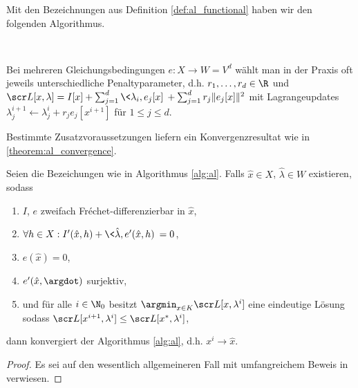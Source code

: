 \documentclass{mythesis}
\begin{document}
\begin{algorithm} \label{alg:al}
    Mit den Bezeichnungen aus Definition \ref{def:al_functional} haben wir den folgenden Algorithmus.

    \begin{samepage}
	\\
	\begin{algorithmic}
	    \EndFor
	\end{algorithmic}
    \end{samepage}
    \begin{note}
	Bei mehreren Gleichungsbedingungen $e: X \to W = V^d$ wählt man in der Praxis oft jeweils unterschiedliche Penaltyparameter, d.h. $r_1, \dotsc, r_d \in \R$ und
	\begin{math}
	    \scr L[x, \lambda] = I[x] + \sum_{j=1}^d \<\lambda_i, e_j[x]\> + \sum_{j=1}^d r_j \|e_j[x]\|^2
	\end{math}
	mit Lagrangeupdates $\lambda^{i+1}_j \gets \lambda^i_j + r_j e_j[x^{i+1}]$ für $1 \le j \le d$.
    \end{note}
\end{algorithm}

Bestimmte Zusatzvoraussetzungen liefern ein Konvergenzresultat wie in \ref{theorem:al_convergence}.

\begin{theorem} \label{theorem:al_convergence}
    Seien die Bezeichungen wie in Algorithmus \ref{alg:al}.
    Falls $\hat x \in X$, $\hat \lambda \in W$ existieren, sodass
    \begin{enumerate}[1)]
        \item
	    $I$, $e$ zweifach Fréchet-differenzierbar in $\hat x$,
	\item
	    $\forall h \in X: I'(\hat x,h) + \<\hat\lambda, e'(\hat x,h)\> = 0$,
	\item
	    $e(\hat x) = 0$,
	\item
	    $e'(\hat x, \argdot)$ surjektiv,
	\item
	    und für alle $i \in \N_0$ besitzt $\argmin_{x\in K} \scr L[x,\lambda^i]$ eine eindeutige Lösung sodass
	    $\scr L[x^{i+1}, \lambda^i] \le \scr L[x^*, \lambda^i]$,
    \end{enumerate}
    dann konvergiert der Algorithmus \ref{alg:al}, d.h. $x^i \to \hat x$.
    \begin{proof}
        Es sei auf den wesentlich allgemeineren Fall mit umfangreichem Beweis in \cite[§3]{ito2008lagrange} verwiesen.
    \end{proof}
\end{theorem}
\end{document}
